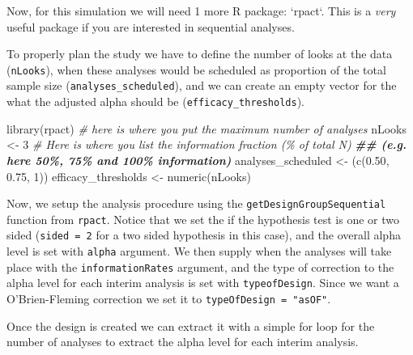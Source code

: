 \documentclass[
]{book}
\newenvironment{Shaded}{\begin{snugshade}}{\end{snugshade}}
\newcommand{\AttributeTok}[1]{\textcolor[rgb]{0.77,0.63,0.00}{#1}}
\newcommand{\CommentTok}[1]{\textcolor[rgb]{0.56,0.35,0.01}{\textit{#1}}}
\newcommand{\ControlFlowTok}[1]{\textcolor[rgb]{0.13,0.29,0.53}{\textbf{#1}}}
\newcommand{\DecValTok}[1]{\textcolor[rgb]{0.00,0.00,0.81}{#1}}
\newcommand{\DocumentationTok}[1]{\textcolor[rgb]{0.56,0.35,0.01}{\textbf{\textit{#1}}}}
\newcommand{\FloatTok}[1]{\textcolor[rgb]{0.00,0.00,0.81}{#1}}
\newcommand{\FunctionTok}[1]{\textcolor[rgb]{0.00,0.00,0.00}{#1}}
\newcommand{\NormalTok}[1]{#1}
\newcommand{\OtherTok}[1]{\textcolor[rgb]{0.56,0.35,0.01}{#1}}
\newcommand{\SpecialCharTok}[1]{\textcolor[rgb]{0.00,0.00,0.00}{#1}}
\newcommand{\StringTok}[1]{\textcolor[rgb]{0.31,0.60,0.02}{#1}}
\begin{document}
Now, for this simulation we will need 1 more R package: `rpact`. This is a \emph{very} useful package if you are interested in sequential analyses.

To properly plan the study we have to define the number of looks at the data (\texttt{nLooks}), when these analyses would be scheduled as proportion of the total sample size (\texttt{analyses\_scheduled}), and we can create an empty vector for the what the adjusted alpha should be (\texttt{efficacy\_thresholds}).

\begin{Shaded}
\begin{Highlighting}[]
\FunctionTok{library}\NormalTok{(rpact)}
\CommentTok{\# here is where you put the maximum number of analyses}
\NormalTok{nLooks }\OtherTok{\textless{}{-}} \DecValTok{3} 
\CommentTok{\# Here is where you list the information fraction (\% of total N)}
\DocumentationTok{\#\# (e.g. here 50\%, 75\% and 100\% information)}
\NormalTok{analyses\_scheduled }\OtherTok{\textless{}{-}}\NormalTok{ (}\FunctionTok{c}\NormalTok{(}\FloatTok{0.50}\NormalTok{, }\FloatTok{0.75}\NormalTok{, }\DecValTok{1}\NormalTok{))}
\NormalTok{efficacy\_thresholds }\OtherTok{\textless{}{-}} \FunctionTok{numeric}\NormalTok{(nLooks)}
\end{Highlighting}
\end{Shaded}

Now, we setup the analysis procedure using the \texttt{getDesignGroupSequential} function from \texttt{rpact}. Notice that we set the if the hypothesis test is one or two sided (\texttt{sided\ =\ 2} for a two sided hypothesis in this case), and the overall alpha level is set with \texttt{alpha} argument. We then supply when the analyses will take place with the \texttt{informationRates} argument, and the type of correction to the alpha level for each interim analysis is set with \texttt{typeofDesign}. Since we want a O'Brien-Fleming correction we set it to \texttt{typeOfDesign\ =\ "asOF"}.

Once the design is created we can extract it with a simple for loop for the number of analyses to extract the alpha level for each interim analysis.

\begin{Shaded}
\end{Shaded}
\end{document}
